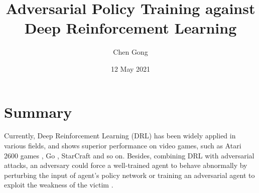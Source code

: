 \documentclass[a4paper]{article}
\title{Adversarial Policy Training against Deep Reinforcement Learning}
\author{Chen Gong}
\date{12 May 2021}
\newcommand{\RNum}[1]{\uppercase\expandafter{\romannumeral #1\relax}}
\begin{document}
\maketitle

\section{Summary}
Currently, Deep Reinforcement Learning (DRL) has been widely applied in various fields, and shows superior performance on video games, such as Atari 2600 games \cite{silver_mastering_2016}, Go \cite{mnih_human-level_2015}, StarCraft \RNum{2} \cite{vinyals2019grandmaster} and so on. Besides, combining DRL with adversarial attacks, an adversary could force a well-trained agent to behave abnormally by perturbing the input of agent’s policy network or training an adversarial agent to exploit the weakness of the victim \cite{adt}.
\end{document}
